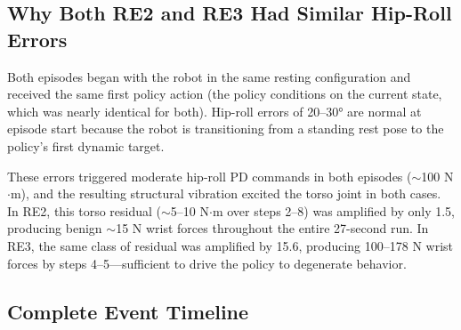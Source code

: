 \documentclass[11pt,a4paper]{article}
\begin{document}
\subsection{Why Both RE2 and RE3 Had Similar Hip-Roll Errors}

Both episodes began with the robot in the same resting configuration and
received the same first policy action (the policy conditions on the current
state, which was nearly identical for both).  Hip-roll errors of 20--30°
are normal at episode start because the robot is transitioning from a
standing rest pose to the policy's first dynamic target.

These errors triggered moderate hip-roll PD commands in both episodes
($\sim$100 N$\cdot$m), and the resulting structural vibration excited the
torso joint in both cases.  In RE2, this torso residual ($\sim$5--10
N$\cdot$m over steps 2--8) was amplified by only 1.5, producing benign
$\sim$15 N wrist forces throughout the entire 27-second run.  In RE3, the
same class of residual was amplified by 15.6, producing 100--178 N wrist
forces by steps 4--5---sufficient to drive the policy to degenerate
behavior.

\subsection{Complete Event Timeline}
\end{document}
